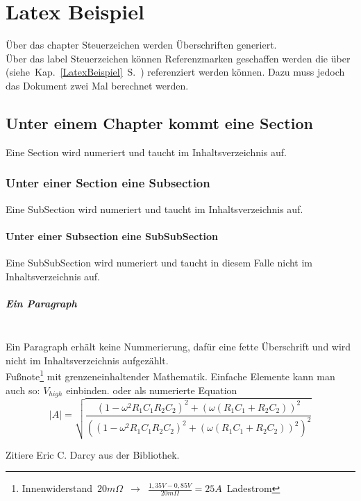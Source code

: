 \chapter{Latex Beispiel}
\thispagestyle{fancy}
\label{LatexBeispiel}
\"Uber das chapter Steuerzeichen werden \"Uberschriften generiert.\\
\"Uber das label Steuerzeichen k\"onnen Referenzmarken geschaffen werden die \"uber \mbox{(siehe Kap. \ref{LatexBeispiel}  S. \pageref{LatexBeispiel})} referenziert werden k\"onnen.
Dazu muss jedoch das Dokument zwei Mal berechnet werden.
\section{Unter einem Chapter kommt eine Section}
Eine Section wird numeriert und taucht im Inhaltsverzeichnis auf.
\subsection{Unter einer Section eine Subsection}
Eine SubSection wird numeriert und taucht im Inhaltsverzeichnis auf.
\subsubsection{Unter einer Subsection eine SubSubSection}
Eine SubSubSection wird numeriert und taucht in diesem Falle nicht im Inhaltsverzeichnis auf.
\paragraph{Ein Paragraph}$\;$\\
Ein Paragraph erh\"alt keine Nummerierung, daf\"ur eine fette \"Uberschrift und wird nicht im Inhaltsverzeichnis aufgez\"ahlt.
\\ %
Fu{\ss}note\footnote{\mbox{Innenwiderstand $20m\Omega$ $\rightarrow$ $\frac{1,35V-0,85V}{20m\Omega}=25A$ Ladestrom}} mit grenzeneinhaltender Mathematik.
Einfache Elemente kann man auch so: $V_{high}$ einbinden.
oder als numerierte Equation
\begin{equation} \label{eq:Tiefpass24}
|A|=\sqrt{\frac{(1-\omega^{2}R_{1}C_{1}R_{2}C_{2})^{2}+(\omega(R_{1}C_{1}+R_{2}C_{2}))^{2}}{\left( (1-\omega^{2}R_{1}C_{1}R_{2}C_{2})^{2}+(\omega(R_{1}C_{1}+R_{2}C_{2}))^{2}\right)^{2}}}
\end{equation}

Zitiere Eric C. Darcy\cite{Darcy} aus der Bibliothek.

